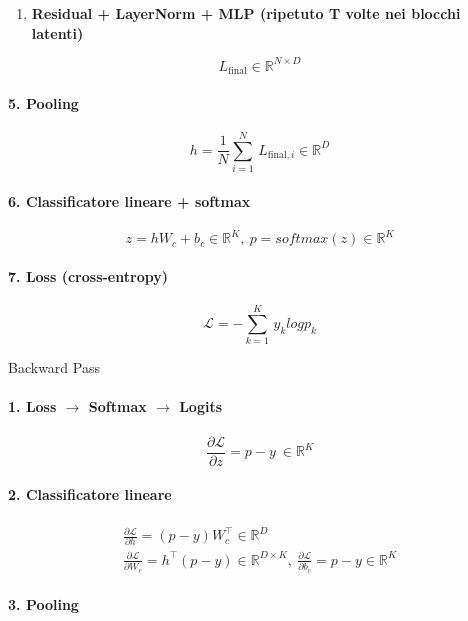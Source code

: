 \documentclass[
  11pt,
]{article}
\begin{document}
\begin{enumerate}
\def\labelenumi{\arabic{enumi}.}
\setcounter{enumi}{3}
\item
  \textbf{Residual + LayerNorm + MLP (ripetuto T volte nei blocchi
  latenti)}
\end{enumerate}

\[L_{\text{final}} \in \mathbb{R}^{N \times D}\]

\paragraph{5. Pooling}

\[h = \frac{1}{N}\sum_{i = 1}^{N}\, L_{\text{final},i} \in \mathbb{R}^{D}\]

\paragraph{6. Classificatore lineare + softmax}

\[z = hW_{c} + b_{c} \in \mathbb{R}^{K},\ p = softmax(z) \in \mathbb{R}^{K}\]

\paragraph{7. Loss (cross-entropy)}

\[\mathcal{L} = - \sum_{k = 1}^{K}\, y_{k}logp_{k}\]

Backward Pass

\paragraph{1. Loss $\rightarrow$ Softmax $\rightarrow$ Logits}

\[\frac{\partial\mathcal{L}}{\partial z} = p - y\  \in \mathbb{R}^{K}\]

\paragraph{2. Classificatore lineare}

\[\begin{matrix}
\frac{\partial\mathcal{L}}{\partial h} = (p - y)W_{c}^{\top} \in \mathbb{R}^{D} \\
\frac{\partial\mathcal{L}}{\partial W_{c}} = h^{\top}(p - y) \in \mathbb{R}^{D \times K},\ \frac{\partial\mathcal{L}}{\partial b_{c}} = p - y \in \mathbb{R}^{K}
\end{matrix}\]

\paragraph{3. Pooling}
\end{document}
